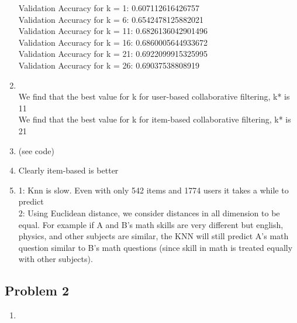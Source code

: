 \documentclass{article}
\begin{document}
\begin{enumerate}[label=\alph*]
    Validation Accuracy for k = 1: 0.607112616426757\\
    Validation Accuracy for k = 6: 0.6542478125882021\\
    Validation Accuracy for k = 11: 0.6826136042901496\\
    Validation Accuracy for k = 16: 0.6860005644933672\\
    Validation Accuracy for k = 21: 0.6922099915325995\\
    Validation Accuracy for k = 26: 0.69037538808919\\
    \item ${}$ \\
    We find that the best value for k for user-based collaborative filtering, k* is 11\\
    We find that the best value for k for item-based collaborative filtering, k* is 21\\
    
    \item (see code)
    \item Clearly item-based is better
    \item 1: Knn is slow. Even with only 542 items and 1774 users it takes a while to predict\\
    2: Using Euclidean distance, we consider distances in all dimension to be equal. For example if A and B's math skills are very different but english, physics, and other subjects are similar, the KNN will still predict A's math question similar to B's math questions (since skill in math is treated equally with other subjects).
\end{enumerate}

\newpage
\subsection*{Problem 2}
\begin{enumerate}[label=\alph*]
    \item 
\end{enumerate}
\end{document}
